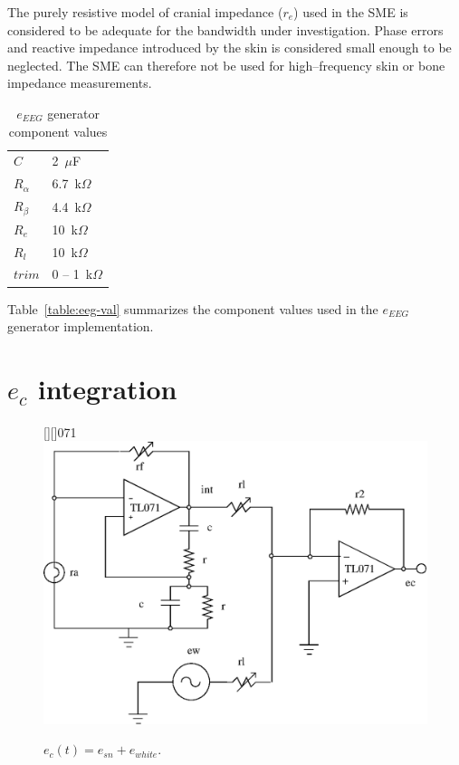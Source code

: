 The purely resistive model of cranial impedance ($r_e$) used in the
SME is considered to be adequate for the bandwidth under
investigation. Phase errors and reactive impedance introduced by the
skin is considered small enough to be neglected. The SME can therefore
not be used for high--frequency skin or bone impedance measurements.

\begin{table}
\begin{center}	
	\begin{tabular}[htpb]{|l|l|} \hline
	$C$ & 2~$\mu$F \\
	$R_{\alpha}$ & 6.7~k$\Omega$ \\
	$R_{\beta}$ & 4.4~k$\Omega$ \\
	$R_e$ & 10~k$\Omega$ \\
	$R_l$ & 10~k$\Omega$ \\
	$trim$ & 0 -- 1~k$\Omega$ \\
	\hline
	\end{tabular}
	\caption{$e_{EEG}$ generator component values}
	\label{table:eeg-val}
\end{center}	
\end{table}

Table~\vref{table:eeg-val} summarizes the component values used in the
$e_{EEG}$ generator implementation.


\section{$e_c$ integration}
\begin{figure}[htbp]
	\begin{center}
	[][]{071}
	\psfrag{+}{+}
	\psfrag{-}{--}
	\includegraphics[width=\textwidth]{ec-int.eps}
    \caption{$e_c(t) = e_{sn} + e_{white}$.}
    \label{fig:ec-int}
	\end{center}
\end{figure}

